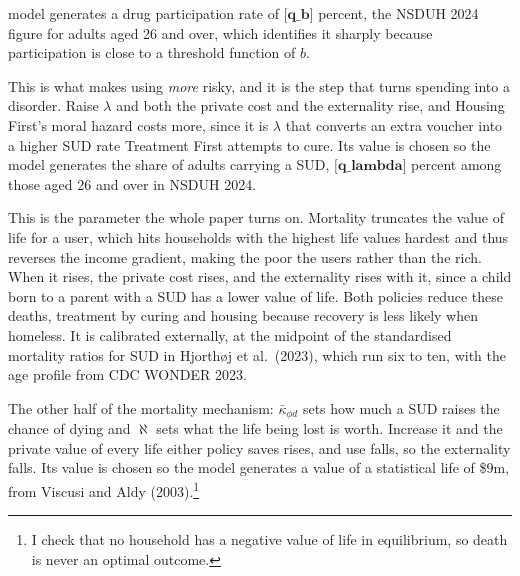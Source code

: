 \documentclass[10pt]{article}
\begin{document}
\begin{description}
model generates a drug participation rate of $\textbf{[q_b]}$ percent, the NSDUH 2024 figure
for adults aged 26 and over, which identifies it sharply because participation is
close to a threshold function of $b$.
\item[$\lambda$, the hazard per unit used.] This is what makes using \emph{more}
risky, and it is the step that turns spending
into a disorder. Raise $\lambda$ and both the private cost and the
externality rise, and Housing First's moral hazard costs more, since it is
$\lambda$ that converts an extra voucher into a higher SUD rate Treatment First
attempts to cure. Its value is chosen so the model generates the share
of adults carrying a SUD, $\textbf{[q_lambda]}$ percent among those aged $26$
and over in NSDUH 2024.
\item[$\bar\kappa_{\phi d}$, increased mortality with a SUD.] This is the parameter the whole
paper turns on. Mortality truncates the value of life for a user, which
hits households with the highest life values hardest and thus reverses the income
gradient, making the poor the users rather than the rich. When it rises,
the private cost rises, and the externality rises
with it, since a child born to a parent with a SUD has a lower value of life.
Both policies reduce these deaths, treatment by curing and housing because recovery
is less likely when homeless. It is calibrated externally, at the midpoint of the
standardised mortality ratios for SUD in Hjorth\o j et al.\ (2023), which run six to
ten, with the age profile from CDC WONDER 2023.
\item[$\aleph$, the flow value of being alive.] The other half of the mortality
mechanism: $\bar\kappa_{\phi d}$ sets how much a SUD raises the chance of dying and
$\aleph$ sets what the life being lost is worth. Increase it and the private
value of every life either policy saves rises, and use falls, so the externality
falls. Its
value is chosen so the model generates a value of a statistical life of \$9m,
from Viscusi and Aldy (2003).\footnote{I check that no household has a
negative value of life in equilibrium, so death is never an optimal outcome.}
\end{description}
\end{document}
